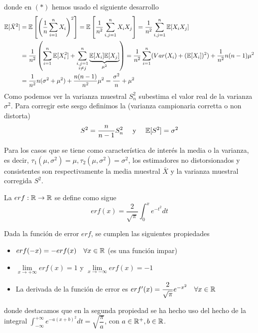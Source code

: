 donde en $(*)$ hemos usado el siguiente desarrollo
\begin{align*}
    \mathbb{E}[\bar{X}^2] &= \mathbb{E}\left[\left(\dfrac{1}{n} \sum\limits_{i=1}^{n} X_i\right)^2\right] = \mathbb{E}\left[\dfrac{1}{n^2} \sum_{i,j=1}^{n} X_i X_j \right]= \dfrac{1}{n^2} \sum_{i,j=1}^{n} \mathbb{E}[X_i X_j] \\
    & = \dfrac{1}{n^2} \left( \sum_{i=1}^{n} \mathbb{E}[X_i^2] + \sum_{\substack{i,j=1 \\ i\neq j}}^{n} \underbrace{\mathbb{E}[X_i]\mathbb{E}[X_j]}_{\mu^2} \right)=\dfrac{1}{n^2} \sum_{i=1}^{n} (Var(X_i) + (\mathbb{E}[X_i])^2) + \dfrac{1}{n^2} n(n-1)\mu^2 \\ 
    & = \dfrac{1}{n^2} n(\sigma^2 + \mu^2) + \dfrac{n(n-1)}{n^2} \mu^2 = \dfrac{\sigma^2}{n} + \mu^2
\end{align*}
Como podemos ver la varianza muestral $S_n^2$ subestima el valor real de la varianza $\sigma^2$. Para corregir este sesgo definimos la  (varianza campionaria corretta o non distorta)
\begin{equation*}
    S^2 =\dfrac{n}{n-1} S_n^2 \quad \text{ y } \quad \mathbb{E}[S^2]= \sigma^2
\end{equation*}

\begin{observacion}
    Para los casos que se tiene como característica de interés la media o la varianza, es decir, $\tau_1(\mu, \sigma^2) = \mu,\tau_2(\mu, \sigma^2) = \sigma^2$, los estimadores no distorsionados y consistentes son respectivamente la media muestral $\bar{X}$ y la varianza muestral corregida $S^2$.
\end{observacion}

\begin{definicion}
    La  $erf:\mathbb{R} \to \mathbb{R}$ se define como sigue 
    \begin{equation*}
        erf(x) = \dfrac{2}{\sqrt{\pi}} \int_{0}^{x} e^{-t^2} dt
    \end{equation*}
\end{definicion}

\begin{prop}
    Dada la función de error $erf$, se cumplen las siguientes propiedades
    \begin{itemize}
        \item $erf(-x) = -erf(x) \quad \forall x \in \mathbb{R}$ (es una función impar)
        \item $\lim\limits_{x\to +\infty} erf(x) = 1$ y $\lim\limits_{x\to -\infty} erf(x) = -1$
        \item La derivada de la función de error es $erf'(x) = \dfrac{2}{\sqrt{\pi}} e^{-x^2} \quad \forall x \in \mathbb{R}$
    \end{itemize}
    donde destacamos que en la segunda propiedad se ha hecho uso del hecho de la integral $\int_{-\infty}^{+\infty} e^{-a(x+b)^2} dt = \sqrt{\dfrac{\pi}{a}}$, con $a\in \mathbb{R}^+, b\in \mathbb{R}$.
\end{prop}

